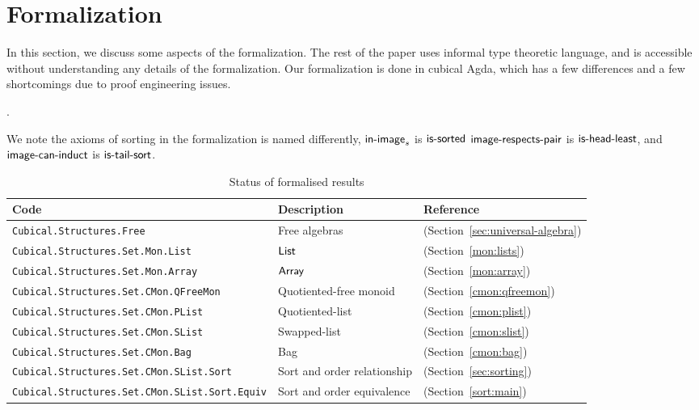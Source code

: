 \section{Formalization}
\label{sec:formalization}

In this section, we discuss some aspects of the formalization.
The rest of the paper uses informal type theoretic language,
and is accessible without understanding any details of the formalization.
Our formalization is done in cubical Agda, which has a few differences and a few
shortcomings due to proof engineering issues.

.

We note the axioms of sorting in the formalization is named differently,
$\operatorname{\mathsf{in-image}}_s$ is $\operatorname{\mathsf{is-sorted}}$
$\operatorname{\mathsf{image-respects-pair}}$ is $\operatorname{\mathsf{is-head-least}}$, and
$\operatorname{\mathsf{image-can-induct}}$ is $\operatorname{\mathsf{is-tail-sort}}$.

\begin{table}[h]
\centering
\begin{tabular}{lll}
\hline
\textbf{Code} & \textbf{Description} & \textbf{Reference}               \\ \hline
\texttt{Cubical.Structures.Free}         & Free algebras            & (Section~\cref{sec:universal-algebra}) \\
\texttt{Cubical.Structures.Set.Mon.List} & $\operatorname{\mathsf{List}}$  & (Section~\cref{mon:lists}) \\
\texttt{Cubical.Structures.Set.Mon.Array} & $\operatorname{\mathsf{Array}}$  & (Section~\cref{mon:array})\\
\texttt{Cubical.Structures.Set.CMon.QFreeMon} & Quotiented-free monoid & (Section~\cref{cmon:qfreemon}) \\
\texttt{Cubical.Structures.Set.CMon.PList} & Quotiented-list & (Section~\cref{cmon:plist}) \\
\texttt{Cubical.Structures.Set.CMon.SList} & Swapped-list & (Section~\cref{cmon:slist}) \\
\texttt{Cubical.Structures.Set.CMon.Bag} & Bag & (Section~\cref{cmon:bag}) \\
\texttt{Cubical.Structures.Set.CMon.SList.Sort} & Sort and order relationship & (Section~\cref{sec:sorting}) \\
\texttt{Cubical.Structures.Set.CMon.SList.Sort.Equiv} & Sort and order equivalence & (Section~\cref{sort:main}) \\
\hline
\end{tabular}
\caption{Status of formalised results}
\label{tab:formalised_results}
\end{table}


